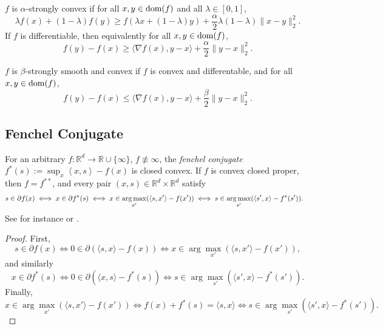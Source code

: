 \documentclass{article}
\def\R{\mathbb R}
\def\dom{\textup{dom}}
\newcommand{\ip}[2]{\left\langle #1, #2 \right \rangle}
\newcommand{\argmax}{\operatornamewithlimits{arg\,max}}
\begin{document}
$f$ is $\alpha$-strongly convex if for all $x,y\in\dom(f)$ and all $\lambda\in[0,1]$,
\begin{equation}
    \lambda f(x)+(1-\lambda)f(y)\ge f(\lambda x+(1-\lambda)y)+\frac{\alpha}{2}\lambda(1-\lambda)\|x-y\|_2^2.
\end{equation}
If $f$ is differentiable, then equivalently for all $x,y\in\dom(f)$,
\begin{equation}
    f(y)-f(x)\ge \langle\nabla f(x),y-x\rangle+\frac{\alpha}{2}\|y-x\|_2^2.
\end{equation}

$f$ is $\beta$-strongly smooth and convex if $f$ is convex and differentable, and for all $x,y\in\dom(f)$,
\begin{equation}\label{smooth}
    f(y)-f(x)\le \langle\nabla f(x),y-x\rangle+\frac{\beta}{2}\|y-x\|_2^2.
\end{equation}

\subsection{Fenchel Conjugate}
For an arbitrary $f : \R^d\to\R\cup \{\infty\}$, $f\not\equiv\infty$, the \emph{fenchel conjugate} $f^*(s) := \sup_x \ip{x}{s} - f(x)$ is closed convex.
    If $f$ is convex closed proper, then $f=f^{**}$, and
    every pair $(x,s) \in \R^d\times\R^d$ satisfy
    \begin{align}\label{conjGrad}
    s \in \partial f(x)
      &\iff
      x \in \partial f^*(s)
      \iff
      x \in \argmax_{x'} ( \ip{s}{x'} - f(x') )
      \iff
      s \in \argmax_{s'} ( \ip{s'}{x} - f^*(s') ).
    \end{align}
    See for instance
    \citep[Theorem 23.5]{ROC}
    or \citep[Corollary E.1.4.4]{HULL}.

    \begin{proof}
        First,
        \begin{equation}
            s\in\partial f(x)\iff0\in\partial(\langle s,x\rangle-f(x))\iff x\in\arg\max_{x'}(\langle s,x'\rangle-f(x')),
        \end{equation}
        and similarly
        \begin{equation}
            x\in\partial f^*(s)\iff0\in\partial(\langle x,s\rangle-f^*(s))\iff s\in\arg\max_{s'}(\langle s',x\rangle-f^*(s')).
        \end{equation}
        Finally,
        \begin{equation}
            x\in\arg\max_{x'}(\langle s,x'\rangle-f(x'))\iff f(x)+f^*(s)=\langle s,x\rangle\iff s\in\arg\max_{s'}(\langle s',x\rangle-f^*(s')).
        \end{equation}
    \end{proof}
\end{document}
